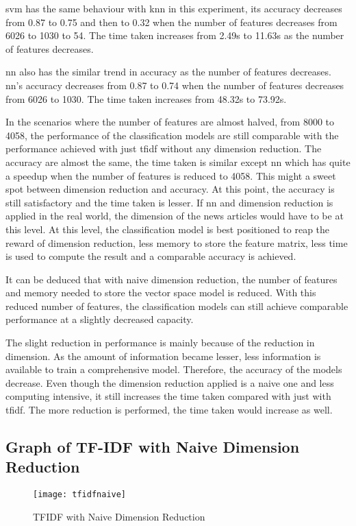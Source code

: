 \Ac{svm} has the same behaviour with \ac{knn} in this experiment, its accuracy decreases from 0.87 to 0.75 and then to 0.32 when the number of features decreases from 6026 to 1030 to 54. The time taken increases from 2.49s to 11.63s as the number of features decreases.

\Ac{nn} also has the similar trend in accuracy as the number of features decreases. \Ac{nn}'s accuracy decreases from 0.87 to 0.74 when the number of features decreases from 6026 to 1030. The time taken increases from 48.32s to 73.92s.

In the scenarios where the number of features are almost halved, from 8000 to 4058, the performance of the classification models are still comparable with the performance achieved with just \ac{tfidf} without any dimension reduction. The accuracy are almost the same, the time taken is similar except \ac{nn} which has quite a speedup when the number of features is reduced to 4058. This might a sweet spot between dimension reduction and accuracy. At this point, the accuracy is still satisfactory and the time taken is lesser. If \ac{nn} and dimension reduction is applied in the real world, the dimension of the news articles would have to be at this level. At this level, the classification model is best positioned to reap the reward of dimension reduction, less memory to store the feature matrix, less time is used to compute the result and a comparable accuracy is achieved.

It can be deduced that with naive dimension reduction, the number of features and memory needed to store the vector space model is reduced. With this reduced number of features, the classification models can still achieve comparable performance at a slightly decreased capacity.

The slight reduction in performance is mainly because of the reduction in dimension. As the amount of information became lesser, less information is available to train a comprehensive model. Therefore, the accuracy of the models decrease. Even though the dimension reduction applied is a naive one and less computing intensive, it still increases the time taken compared with just with \ac{tfidf}. The more reduction is performed, the time taken would increase as well.

\subsection{Graph of TF-IDF with Naive Dimension Reduction}
\begin{figure} [H]
	\centering
	\texttt{[image: tfidfnaive]}
	\caption{TFIDF with Naive Dimension Reduction}
	\label{fig:tfidfnaive}
\end{figure}

